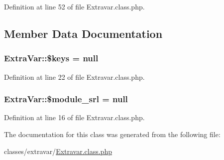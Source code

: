 Definition at line 52 of file Extravar.\-class.\-php.



\subsection{Member Data Documentation}
\hypertarget{classExtraVar_ac2aee2ca8a3299c952ba8f155eaadc64}{
\subsubsection[{\$keys}]{\setlength{\rightskip}{0pt plus 5cm}Extra\-Var\-::\$keys = null}}\label{classExtraVar_ac2aee2ca8a3299c952ba8f155eaadc64}


Definition at line 22 of file Extravar.\-class.\-php.

\hypertarget{classExtraVar_a3a84e48f2cdf01660b2844244f8fd9f7}{
\subsubsection[{\$module\-\_\-srl}]{\setlength{\rightskip}{0pt plus 5cm}Extra\-Var\-::\$module\-\_\-srl = null}}\label{classExtraVar_a3a84e48f2cdf01660b2844244f8fd9f7}


Definition at line 16 of file Extravar.\-class.\-php.



The documentation for this class was generated from the following file\-:\begin{DoxyCompactItemize}
\item 
classes/extravar/\hyperlink{Extravar_8class_8php}{Extravar.\-class.\-php}\end{DoxyCompactItemize}
